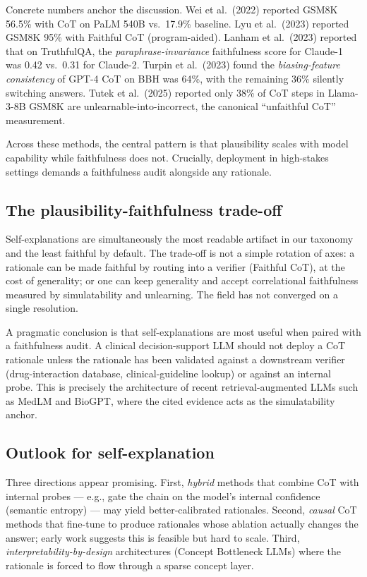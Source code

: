 \documentclass{article}
\begin{document}
Concrete numbers anchor the discussion. Wei et al.~(2022) reported GSM8K 56.5\% with CoT on PaLM 540B vs.~17.9\% baseline. Lyu et al.~(2023) reported GSM8K 95\% with Faithful CoT (program-aided). Lanham et al.~(2023) reported that on TruthfulQA, the \emph{paraphrase-invariance} faithfulness score for Claude-1 was 0.42 vs.~0.31 for Claude-2. Turpin et al.~(2023) found the \emph{biasing-feature consistency} of GPT-4 CoT on BBH was 64\%, with the remaining 36\% silently switching answers. Tutek et al.~(2025) reported only 38\% of CoT steps in Llama-3-8B GSM8K are unlearnable-into-incorrect, the canonical ``unfaithful CoT'' measurement.

Across these methods, the central pattern is that plausibility scales with model capability while faithfulness does not. Crucially, deployment in high-stakes settings demands a faithfulness audit alongside any rationale.

\subsection{The plausibility-faithfulness trade-off}\label{the-plausibility-faithfulness-trade-off}

Self-explanations are simultaneously the most readable artifact in our taxonomy and the least faithful by default. The trade-off is not a simple rotation of axes: a rationale can be made faithful by routing into a verifier (Faithful CoT), at the cost of generality; or one can keep generality and accept correlational faithfulness measured by simulatability and unlearning. The field has not converged on a single resolution.

A pragmatic conclusion is that self-explanations are most useful when paired with a faithfulness audit. A clinical decision-support LLM should not deploy a CoT rationale unless the rationale has been validated against a downstream verifier (drug-interaction database, clinical-guideline lookup) or against an internal probe. This is precisely the architecture of recent retrieval-augmented LLMs such as MedLM and BioGPT, where the cited evidence acts as the simulatability anchor.

\subsection{Outlook for self-explanation}\label{outlook-for-self-explanation}

Three directions appear promising. First, \emph{hybrid} methods that combine CoT with internal probes --- e.g., gate the chain on the model's internal confidence (semantic entropy) --- may yield better-calibrated rationales. Second, \emph{causal} CoT methods that fine-tune to produce rationales whose ablation actually changes the answer; early work \citep{lanham2023measuringfaithfuln} suggests this is feasible but hard to scale. Third, \emph{interpretability-by-design} architectures (Concept Bottleneck LLMs) where the rationale is forced to flow through a sparse concept layer.
\end{document}
